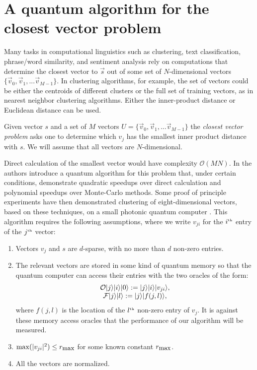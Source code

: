 \section{A quantum algorithm for the closest vector problem}
\label{sec:qalg}

Many tasks in computational linguistics such as clustering, text classification, phrase/word similarity, and sentiment analysis rely on computations that determine the closest vector to $\vec{s}$ out of some set of $N$-dimensional vectors $\{\vec{v}_0,\vec{v}_1,...\vec{v}_{M-1}\}$. In clustering algorithms, for example, the set of vectors could be either the centroids of different clusters or the full set of training vectors, as in nearest neighbor clustering algorithms. Either the inner-product distance or Euclidean distance can be used.

\begin{defn}
Given vector $s$ and a set of $M$ vectors $U = \{\vec{v}_0,\vec{v}_1,...\vec{v}_{M-1}\}$ the \emph{closest vector problem} asks one to determine which $v_j$ has the smallest inner product distance with $s$. We will assume that all vectors are $N$-dimensional.
\end{defn}

Direct calculation of the smallest vector would have complexity $\mathcal{O}(MN)$.  In \cite{wiebe2014quantum} the authors introduce a quantum algorithm for this problem that, under certain conditions, demonstrate quadratic speedups over direct calculation and polynomial speedups over Monte-Carlo methods. Some proof of principle experiments have then demonstrated clustering of eight-dimensional vectors, based on these techniques, on a small photonic quantum computer \cite{cai2015entanglement}. This algorithm requires the following assumptions, where we write $v_{ji}$ for the $i^{\tiny\mbox{th}}$ entry of the $j^{\tiny\mbox{th}}$ vector:
\begin{enumerate}
\item Vectors $v_j$ and $s$ are $d$-sparse, with no more than $d$ non-zero entries.
\item The relevant vectors are stored in some kind of quantum memory so that the quantum computer can access their entries with the two oracles of the form:
\begin{equation}
\begin{array}{c}
\mathcal{O}| j \rangle| i \rangle| 0 \rangle:=| j \rangle| i \rangle| v_{ji} \rangle, \\
\mathcal{F}| j \rangle| l \rangle:= | j \rangle| f(j,l) \rangle,
\end{array}
\end{equation}
where $f(j,l)$ is the location of the $l^{\tiny\mbox{th}}$ non-zero entry of $v_j$.  It is against these memory access oracles that the performance of our algorithm will be measured.

\item $\max(|v_{ji}|^2)\le r_{\small\mbox{max}}$ for some known constant $r_{\small\mbox{max}}$.

\item All the vectors are normalized.
 
\end{enumerate}

